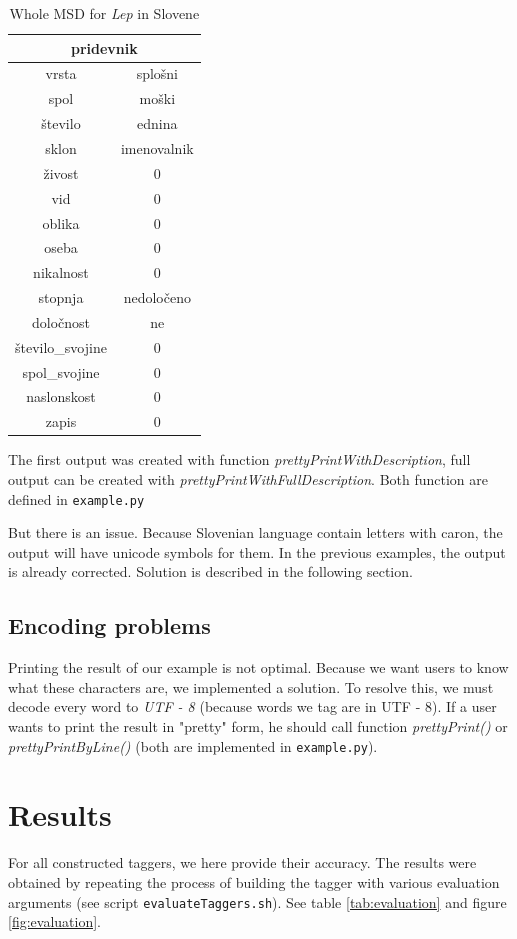 \documentclass[10pt, conference, compsocconf]{IEEEtran}
\begin{document}
\begin{table}[h]
\begin{center}
\begin{tabular}{c|c}
\multicolumn{2}{c}{pridevnik}\\\hline\hline
vrsta & splošni \\
spol & moški \\
število & ednina \\
sklon & imenovalnik \\
živost & 0 \\
vid & 0 \\
oblika & 0 \\
oseba & 0 \\
nikalnost & 0 \\
stopnja & nedoločeno \\
določnost & ne \\
število\_svojine & 0 \\
spol\_svojine & 0 \\
naslonskost & 0 \\
zapis & 0 \\
\end{tabular}
\end{center}
\caption{Whole MSD for \textit{Lep} in Slovene}
\label{tab:MSDLep}
\end{table}

The first output was created with function \textit{prettyPrintWithDescription}, full output can be created with \textit{prettyPrintWithFullDescription}. Both function are defined in \texttt{example.py}
\par
But there is an issue. Because Slovenian language contain letters with caron, the output will have unicode symbols for them. In the previous examples, the output is already corrected. Solution is described in the following section. 

\subsection{Encoding problems} %
Printing the result of our example is not optimal. Because we want users to know what these characters are, we implemented a solution. To resolve this, we must decode every word to \textit{UTF - 8} (because words we tag are in UTF - 8). If a user wants to print the result in "pretty" form, he should call function \textit{prettyPrint()} or \textit{prettyPrintByLine()} (both are implemented in \texttt{example.py}).

\section{Results} %
\label{results}
For all constructed taggers, we here provide their accuracy. The results were obtained by repeating the process of building the tagger with various evaluation arguments (see script \texttt{evaluateTaggers.sh}). See table \ref{tab:evaluation} and figure \ref{fig:evaluation}.
\end{document}
